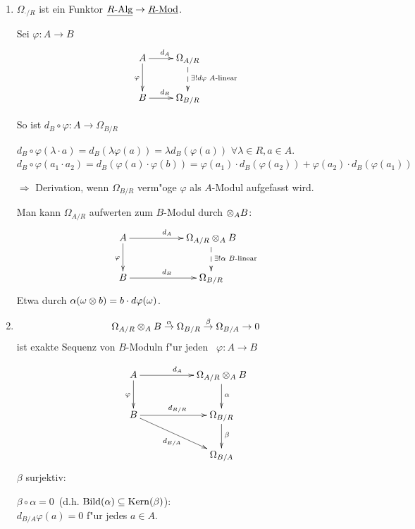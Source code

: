 \documentclass[a4paper, 10pt]{report}
\begin{document}
\begin{Prop}
\begin{enumerate}
\item
$\Omega_{\cdot/R}$ ist ein Funktor $\underline{{R}\text{-Alg}} \to \underline{{R}\text{-Mod}}$.

\begin{Bew}
Sei $\varphi: A \rightarrow B$ \RAlgHom
$$
\begin{xy}
\xymatrix{
A \ar[r]^{d_A} \ar[d]_{\varphi}  & \ar@{-->}[d]^{\exists!d\varphi \text{ $A$-linear}} \Omega_{A/R} \\
B \ar[r]^{d_B}                   & \Omega_{B/R}
}
\end{xy}
$$

So ist $d_B \circ \varphi : A \rightarrow \Omega_{B/R}$

$d_B \circ \varphi(\lambda \cdot a) = d_B(\lambda \varphi(a)) = \lambda d_B(\varphi(a))$ $\forall\lambda \in R, a \in A$.\\
$d_B \circ \varphi(a_1 \cdot a_2) = d_B(\varphi(a) \cdot \varphi(b)) = \varphi(a_1) \cdot d_B(\varphi(a_2)) + \varphi(a_2) \cdot d_B(\varphi(a_1))$

$\Rightarrow$ Derivation, wenn $\Omega_{B/R}$ verm"oge $\varphi$ als $A$-Modul aufgefasst wird.

Man kann $\Omega_{A/R}$ aufwerten zum $B$-Modul durch $\ten[A] B$:
$$
\begin{xy}
\xymatrix{
A \ar[rr]^{d_A} \ar[d]_{\varphi}  & & \ar@{-->}[d]^{\exists!\alpha \text{ $B$-linear}} \Omega_{A/R} \ten[A] B \\
B \ar[rr]^{d_B}                   & & \Omega_{B/R}
}
\end{xy}
$$
Etwa durch $\alpha(\omega \ten b) = b \cdot d\varphi(\omega)$.
\end{Bew}

\item
$$\Omega_{A/R} \ten[A] B \overset{\alpha}{\rightarrow} \Omega_{B/R} \overset{\beta}{\rightarrow} \Omega_{B/A} \rightarrow 0$$
ist exakte Sequenz von $B$-Moduln f"ur jeden \RAlgHom\ $\varphi: A \rightarrow B$

\begin{Bew}
\[\xymatrix{
A \ar[rr]^{d_A} \ar[d]_{\varphi}  & & \ar[d]^\alpha \Omega_{A/R} \ten[A] B \\
B \ar[rr]^{d_{B/R}}\ar[drr]_{d_{B/A}} & & \Omega_{B/R}\ar[d]^\beta \\
&&\Omega_{B/A}
}\]
$\beta$ surjektiv: \chk

\glqq$\beta \circ \alpha = 0$\grqq\ (d.h. $\mathrm{Bild}(\alpha) \subseteq \mathrm{Kern}(\beta)$):\\
$d_{B/A}\varphi(a) = 0$ f"ur jedes $a \in A$.


\end{Bew}
\end{enumerate}
\end{Prop}
\end{document}
